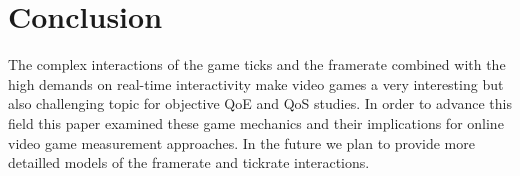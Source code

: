 \section{Conclusion}
\label{sec:conclusion}

The complex interactions of the game ticks and the framerate combined with the high demands on real-time interactivity make video games a very interesting but also challenging topic for objective \gls{QoE} and \gls{QoS} studies. In order to advance this field this paper examined these game mechanics and their implications for online video game measurement approaches. In the future we plan to provide more detailled models of the framerate and tickrate interactions.